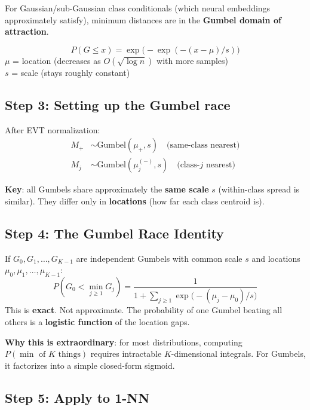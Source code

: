 \documentclass[11pt,a4paper]{article}
\begin{document}
For Gaussian/sub-Gaussian class conditionals (which neural embeddings approximately satisfy), minimum distances are in the \textbf{Gumbel domain of attraction}.

\begin{keybox}
\vspace{-0.3cm}
\[
P(G \leq x) = \exp\!\bigl(-\exp(-(x-\mu)/s)\bigr)
\]
$\mu$ = location (decreases as $O(\sqrt{\log n})$ with more samples)\\
$s$ = scale (stays roughly constant)
\end{keybox}

\subsection{Step 3: Setting up the Gumbel race}

After EVT normalization:
\begin{align}
M_+ &\sim \mathrm{Gumbel}(\mu_+, s) \quad \text{(same-class nearest)} \\
M_j &\sim \mathrm{Gumbel}(\mu_j^{(-)}, s) \quad \text{(class-$j$ nearest)}
\end{align}

\textbf{Key}: all Gumbels share approximately the \textbf{same scale} $s$ (within-class spread is similar). They differ only in \textbf{locations} (how far each class centroid is).

\subsection{Step 4: The Gumbel Race Identity}

\begin{derivbox}
If $G_0, G_1, \ldots, G_{K-1}$ are independent Gumbels with common scale $s$ and locations $\mu_0, \mu_1, \ldots, \mu_{K-1}$:
\[
\boxed{P(G_0 < \min_{j \geq 1} G_j) = \frac{1}{1 + \sum_{j \geq 1} \exp\!\bigl(-(\mu_j - \mu_0)/s\bigr)}}
\]
This is \textbf{exact}. Not approximate. The probability of one Gumbel beating all others is a \textbf{logistic function} of the location gaps.
\end{derivbox}

\textbf{Why this is extraordinary}: for most distributions, computing $P(\min \text{ of } K \text{ things})$ requires intractable $K$-dimensional integrals. For Gumbels, it factorizes into a simple closed-form sigmoid.

\subsection{Step 5: Apply to 1-NN}
\end{document}
